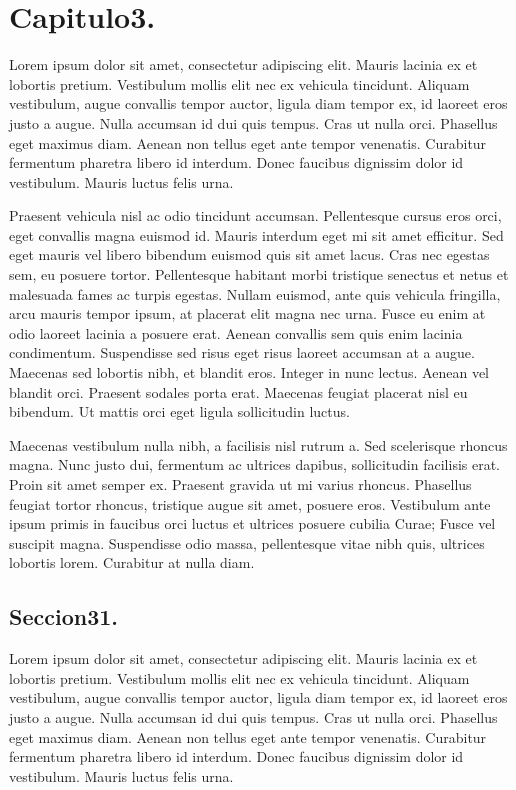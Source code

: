 \chapter{Capitulo3.}\label{cap:capitulo2}

Lorem ipsum dolor sit amet, consectetur adipiscing elit. Mauris lacinia ex et lobortis pretium. Vestibulum mollis elit nec ex vehicula tincidunt. Aliquam vestibulum, augue convallis tempor auctor, ligula diam tempor ex, id laoreet eros justo a augue. Nulla accumsan id dui quis tempus. Cras ut nulla orci. Phasellus eget maximus diam. Aenean non tellus eget ante tempor venenatis. Curabitur fermentum pharetra libero id interdum. Donec faucibus dignissim dolor id vestibulum. Mauris luctus felis urna.

Praesent vehicula nisl ac odio tincidunt accumsan. Pellentesque cursus eros orci, eget convallis magna euismod id. Mauris interdum eget mi sit amet efficitur. Sed eget mauris vel libero bibendum euismod quis sit amet lacus. Cras nec egestas sem, eu posuere tortor. Pellentesque habitant morbi tristique senectus et netus et malesuada fames ac turpis egestas. Nullam euismod, ante quis vehicula fringilla, arcu mauris tempor ipsum, at placerat elit magna nec urna. Fusce eu enim at odio laoreet lacinia a posuere erat. Aenean convallis sem quis enim lacinia condimentum. Suspendisse sed risus eget risus laoreet accumsan at a augue. Maecenas sed lobortis nibh, et blandit eros. Integer in nunc lectus. Aenean vel blandit orci. Praesent sodales porta erat. Maecenas feugiat placerat nisl eu bibendum. Ut mattis orci eget ligula sollicitudin luctus.

Maecenas vestibulum nulla nibh, a facilisis nisl rutrum a. Sed scelerisque rhoncus magna. Nunc justo dui, fermentum ac ultrices dapibus, sollicitudin facilisis erat. Proin sit amet semper ex. Praesent gravida ut mi varius rhoncus. Phasellus feugiat tortor rhoncus, tristique augue sit amet, posuere eros. Vestibulum ante ipsum primis in faucibus orci luctus et ultrices posuere cubilia Curae; Fusce vel suscipit magna. Suspendisse odio massa, pellentesque vitae nibh quis, ultrices lobortis lorem. Curabitur at nulla diam. 



\section{Seccion31.}

Lorem ipsum dolor sit amet, consectetur adipiscing elit. Mauris lacinia ex et lobortis pretium. Vestibulum mollis elit nec ex vehicula tincidunt. Aliquam vestibulum, augue convallis tempor auctor, ligula diam tempor ex, id laoreet eros justo a augue. Nulla accumsan id dui quis tempus. Cras ut nulla orci. Phasellus eget maximus diam. Aenean non tellus eget ante tempor venenatis. Curabitur fermentum pharetra libero id interdum. Donec faucibus dignissim dolor id vestibulum. Mauris luctus felis urna.


